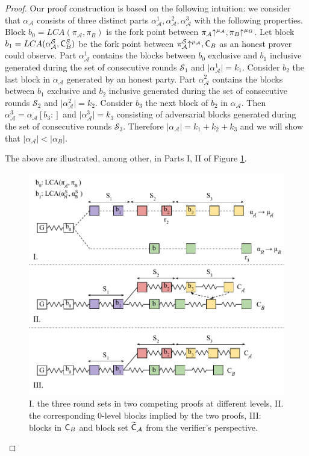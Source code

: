 \begin{proof}
Our proof construction is based on the following intuition: we consider that $\alpha_\mathcal{A}$ consists of three distinct parts $\alpha_\mathcal{A}^1, \alpha_\mathcal{A}^2, \alpha_\mathcal{A}^3$ with the following properties.
Block $b_0 = LCA(\pi_\mathcal{A}, \pi_B)$ is the fork point between $\pi_\mathcal{A} \negthickspace\uparrow^{\mu_\mathcal{A}}, \pi_B \negthickspace\uparrow^{\mu_B}$. Let block $b_1 = LCA (\alpha^{\mathcal{S}}_\mathcal{A}, \mathsf{C}^S_B)$ be the fork point between $\pi^{\mathcal{S}}_\mathcal{A} \negthickspace\uparrow^{\mu_\mathcal{A}}, \mathsf{C}_B $ as an honest prover could observe. Part $\alpha_\mathcal{A}^1$ contains the blocks between $b_0$ exclusive and $b_1$ inclusive generated during the set of consecutive rounds $\mathcal{S}_1$ and $\lvert  \alpha_\mathcal{A}^1 \rvert = k_1$. Consider $b_2$ the last block in $\alpha_\mathcal{A}$ generated by an honest party. Part $\alpha_{\mathcal{A}}^2$ contains the blocks between $b_1$ exclusive and $b_2$ inclusive generated during the set of consecutive rounds $\mathcal{S}_2$ and $\vert  \alpha_\mathcal{A}^2 \vert = k_2$. Consider $b_3$ the next block of $b_2$ in $\alpha_\mathcal{A}$. Then $\alpha_{\mathcal{A}}^3 = \alpha_\mathcal{A}[b_3{:}]$ and $\vert  \alpha_\mathcal{A}^3 \vert = k_3$ consisting of adversarial blocks generated during the set of consecutive rounds $\mathcal{S}_3$. Therefore $\vert \alpha_\mathcal{A} \vert = k_1 + k_2 + k_3$ and we will show that $\vert \alpha_\mathcal{A} \vert < \vert \alpha_B \vert$.

The above are illustrated, among other, in Parts I, II of Figure \ref{fig:proof_velvet}.

\begin{figure}[h!]
    \begin{center}
        \includegraphics[width=\columnwidth]{figures/proof_velvet-crop.pdf}
    \end{center}
    \caption{I. the three round sets in two competing proofs at different levels, II. the corresponding 0-level blocks implied by the two proofs, III: blocks in $\mathsf{C}_B$ and block set $\widetilde{\mathsf{C}}_\mathcal{A}$ from the verifier's perspective.}
    \label{fig:proof_velvet}
\end{figure}


\end{proof}
